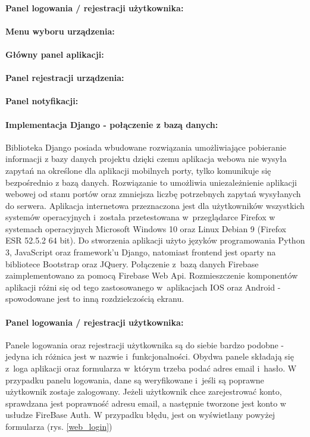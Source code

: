 \paragraph{Panel logowania / rejestracji użytkownika:}
\paragraph{Menu wyboru urządzenia:}
\paragraph{Główny panel aplikacji:}
\paragraph{Panel rejestracji urządzenia:}
\paragraph{Panel notyfikacji:}


\paragraph{Implementacja Django - połączenie z bazą danych:}
Biblioteka Django posiada wbudowane rozwiązania umożliwiające pobieranie informacji z bazy danych projektu dzięki czemu aplikacja webowa nie wysyła zapytań na określone dla aplikacji mobilnych porty, tylko komunikuje się bezpośrednio z bazą danych. Rozwiązanie to umożliwia uniezależnienie aplikacji webowej od stanu portów oraz zmniejsza liczbę potrzebnych zapytań wysyłanych do serwera.
Aplikacja internetowa przeznaczona jest dla użytkowników wszystkich systemów operacyjnych i~została przetestowana w~przeglądarce Firefox w systemach operacyjnych Microsoft Windows 10 oraz Linux Debian 9 (Firefox ESR 52.5.2 64 bit). Do stworzenia aplikacji użyto języków programowania Python 3, JavaScript oraz framework'u Django, natomiast frontend jest oparty na bibliotece Bootstrap oraz JQuery. Połączenie z~bazą danych Firebase zaimplementowano za pomocą Firebase Web Api. Rozmieszczenie komponentów aplikacji różni się od tego zastosowanego w~aplikacjach IOS oraz Android - spowodowane jest to inną rozdzielczością ekranu. 

\paragraph{Panel logowania / rejestracji użytkownika:} Panele logowania oraz rejestracji użytkownika są do siebie bardzo podobne - jedyna ich różnica jest w nazwie i~funkcjonalności. Obydwa panele składają się z~loga aplikacji oraz formularza w~którym trzeba podać adres email i~hasło. W przypadku panelu logowania, dane są weryfikowane i~jeśli są poprawne użytkownik zostaje zalogowany. Jeżeli użytkownik chce zarejestrować konto, sprawdzana jest poprawność adresu email, a następnie tworzone jest konto w usłudze FireBase Auth. W przypadku błędu, jest on wyświetlany powyżej formularza (rys. \ref{web_login})

